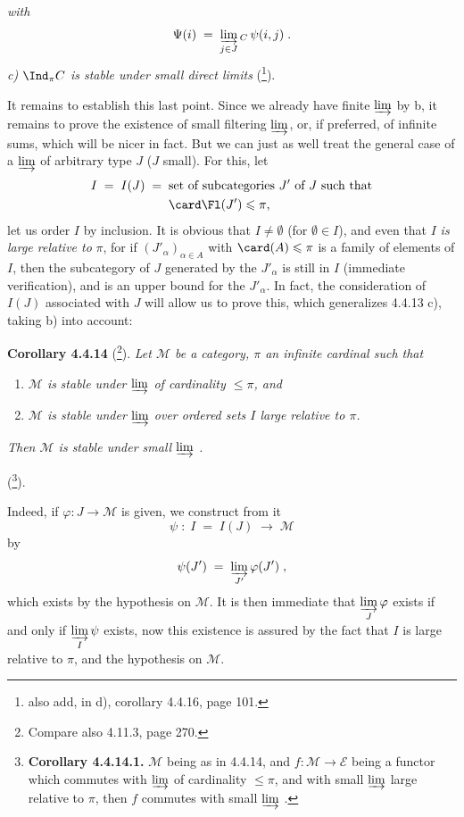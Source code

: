 
\textit{with}
\[
\Psi(i) \;=\; \varinjlim_{j\in J}{}_{C}\,\psi(i,j)\;.
\]
\textit{c)} $\Ind_\pi C$ \textit{is stable under small direct limits} (\footnote{also add, in d), corollary 4.4.16, page 101.}).

It remains to establish this last point. Since we already have finite $\varinjlim$ by b, it remains to prove the existence of small filtering $\varinjlim$, or, if preferred, of infinite sums, which will be nicer in fact. But
we can just as well treat the general case of a $\varinjlim$ of arbitrary type $J$ ($J$ small). For this, let
\[
I \;=\; I(J) \;=\; \begin{aligned}[t]
&\text{set of subcategories } J' \text{ of } J \text{ such that}\\
&\card\Fl(J')\leqslant\pi,
\end{aligned}
\]
let us order $I$ by inclusion. It is obvious that $I\neq\emptyset$ (for $\emptyset\in I$), and even that $I$ \textit{is large relative to} $\pi$, for if $(J'_\alpha)_{\alpha\in A}$ with $\card(A)\leqslant\pi$ is a family of elements of $I$, then the subcategory of $J$ generated by the $J'_\alpha$ is still in $I$ (immediate verification), and is an upper bound for the $J'_\alpha$. In fact, the consideration of $I(J)$ associated with $J$ will allow us to prove this, which generalizes 4.4.13 c), taking b) into account:

\textbf{Corollary 4.4.14} (\footnote{Compare also 4.11.3, page 270.}). \textit{Let $\mathcal{M}$ be a category, $\pi$ an infinite cardinal such that}
\begin{enumerate}
\item[a)] \textit{$\mathcal{M}$ is}
\textit{stable under $\varinjlim$ of cardinality $\leqslant\pi$, and}
\item[b)] \textit{$\mathcal{M}$ is stable under $\varinjlim$ over ordered sets $I$ large relative to $\pi$.}
\end{enumerate}
\textit{Then $\mathcal{M}$ is stable under small $\varinjlim$ .}

(\footnote{\textbf{Corollary 4.4.14.1.} $\mathcal{M}$ being as in 4.4.14, and $f:\mathcal{M}\longrightarrow\mathcal{E}$ being a functor which commutes with $\varinjlim$ of cardinality $\leqslant\pi$, and with small $\varinjlim$ large relative to $\pi$, then $f$ commutes with small $\varinjlim$ .}).

Indeed, if $\varphi:J\longrightarrow\mathcal{M}$ is given, we construct from it
\[
\psi\;:\;I\;=\;I(J)\;\longrightarrow\;\mathcal{M}
\]
by
\[
\psi(J')\;=\;\varinjlim_{J'}\varphi(J')\;,
\]
which exists by the hypothesis on $\mathcal{M}$. It is then immediate that $\varinjlim\limits_{J}\varphi$ exists if and only if $\varinjlim\limits_{I}\psi$ exists, now this existence is assured by the fact that $I$ is large relative to $\pi$, and the hypothesis on $\mathcal{M}$.

